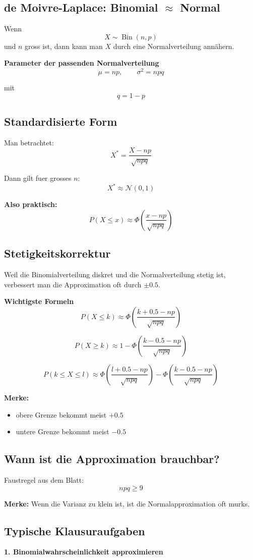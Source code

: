 \documentclass[a4paper,11pt]{article}
\begin{document}
\subsection{de Moivre-Laplace: Binomial $\approx$ Normal}
Wenn
\[
X\sim \operatorname{Bin}(n,p)
\]
und $n$ gross ist, dann kann man $X$ durch eine Normalverteilung ann\"ahern.

\textbf{Parameter der passenden Normalverteilung}
\[
\mu=np,\qquad \sigma^2=npq
\]

mit
\[
q=1-p
\]

\subsection{Standardisierte Form}
Man betrachtet:
\[
X^*=\frac{X-np}{\sqrt{npq}}
\]

Dann gilt fuer grosses $n$:
\[
X^* \approx \mathcal N(0,1)
\]

\textbf{Also praktisch:}
\[
P(X\le x)\approx \Phi\left(\frac{x-np}{\sqrt{npq}}\right)
\]

\subsection{Stetigkeitskorrektur}
Weil die Binomialverteilung diskret und die Normalverteilung stetig ist, verbessert man die Approximation oft durch $\pm 0.5$.

\textbf{Wichtigste Formeln}
\[
P(X\le k)\approx \Phi\left(\frac{k+0.5-np}{\sqrt{npq}}\right)
\]

\[
P(X\ge k)\approx 1-\Phi\left(\frac{k-0.5-np}{\sqrt{npq}}\right)
\]

\[
P(k\le X\le l)\approx
\Phi\left(\frac{l+0.5-np}{\sqrt{npq}}\right)
-\Phi\left(\frac{k-0.5-np}{\sqrt{npq}}\right)
\]

\textbf{Merke:}
\begin{itemize}
  \item obere Grenze bekommt meist $+0.5$
  \item untere Grenze bekommt meist $-0.5$
\end{itemize}

\subsection{Wann ist die Approximation brauchbar?}
Faustregel aus dem Blatt:
\[
npq\ge 9
\]

\textbf{Merke:}
Wenn die Varianz zu klein ist, ist die Normalapproximation oft murks.

\subsection{Typische Klausuraufgaben}
\textbf{1. Binomialwahrscheinlichkeit approximieren}
\end{document}
